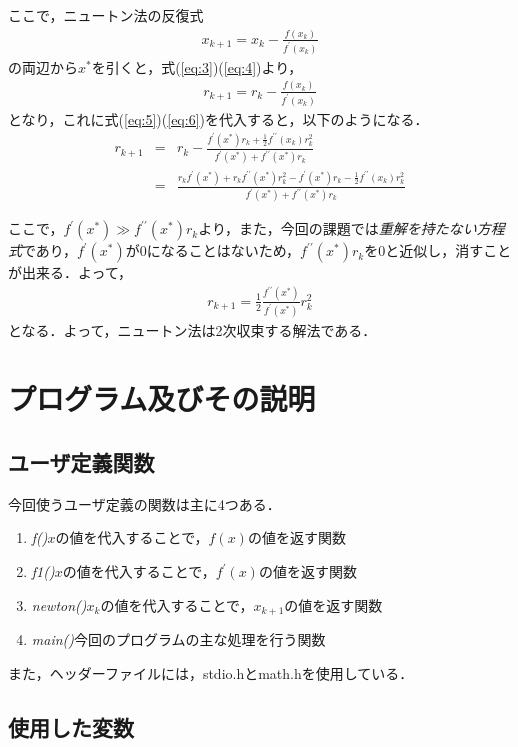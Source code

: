 \documentclass[12pt]{jarticle}
\renewcommand  \[  {\begin{eqnarray}}
\renewcommand  \]  {\end{eqnarray}}
\begin{document}
ここで，ニュートン法の反復式
\[
x_{k+1}=x_k-\frac{f(x_k)}{f^{\prime}(x_k)}
\label{eq:7}
\]
の両辺から$x^{\ast}$を引くと，式(\ref{eq:3})(\ref{eq:4})より，
\[
r_{k+1}=r_k-\frac{f(x_k)}{f^{\prime}(x_k)}
\label{eq:8}
\]
となり，これに式(\ref{eq:5})(\ref{eq:6})を代入すると，以下のようになる．
\[
r_{k+1}&=&r_k-\frac{f^{\prime}(x^{\ast})r_k+\frac{1}{2}f^{\prime\prime}(x_k)r_k^2}{f^{\prime}(x^{\ast})+f^{\prime\prime}(x^{\ast})r_k} \nonumber \\
&=&\frac{r_kf^{\prime}(x^{\ast})+r_kf^{\prime\prime}(x^{\ast})r_k^2-f^{\prime}(x^{\ast})r_k-\frac{1}{2}f^{\prime\prime}(x_k)r_k^2}{f^{\prime}(x^{\ast})+f^{\prime\prime}(x^{\ast})r_k}
\label{eq:9}
\]

ここで，$f^{\prime}(x^{\ast}) \gg f^{\prime\prime}(x^{\ast})r_k$より，また，今回の課題では\emph{重解を持たない方程式}であり，$f^{\prime}(x^{\ast})$が0になることはないため，$f^{\prime\prime}(x^{\ast})r_k$を0と近似し，消すことが出来る．よって，
\[
r_{k+1}=\frac{1}{2}\frac{f^{\prime\prime}(x^{\ast})}{f^{\prime}(x^{\ast})}r_k^2
\label{eq:10}
\]
となる．よって，ニュートン法は2次収束する解法である．



\section{プログラム及びその説明}
\subsection{ユーザ定義関数}

今回使うユーザ定義の関数は主に4つある．
\begin{enumerate}
\item \emph{f()}\qquad $x$の値を代入することで，$f(x)$の値を返す関数
\item \emph{f1()}\qquad $x$の値を代入することで，$f^{\prime}(x)$の値を返す関数
\item \emph{newton()}\qquad $x_k$の値を代入することで，$x_{k+1}$の値を返す関数
\item \emph{main()}\qquad 今回のプログラムの主な処理を行う関数
\end{enumerate}

また，ヘッダーファイルには，stdio.hとmath.hを使用している．

\subsection{使用した変数}
\end{document}
